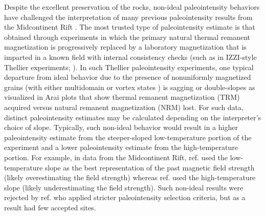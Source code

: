 \documentclass[9pt,twocolumn,twoside,lineno]{pnas-new}
\begin{document}
Despite the excellent preservation of the rocks, non-ideal paleointensity behaviors have challenged the interpretation of many previous paleointensity results from the Midcontinent Rift \cite{Pesonen1983a, Kulakov2013a, Sprain2018a}. The most trusted type of paleointensity estimate is that obtained through experiments in which the primary natural thermal remanent magnetization is progressively replaced by a laboratory magnetization that is imparted in a known field with internal consistency checks (such as in IZZI-style Thellier experiments;  \citealp{Yu2004a}). In such Thellier paleointensity experiments, one typical departure from ideal behavior due to the presence of nonuniformly magnetized grains (with either multidomain \cite{Dunlop2001a} or vortex states \cite{Tauxe2020a}) is sagging or double-slopes as visualized in Arai plots that show thermal remanent magnetization (TRM) acquired versus natural remanent magnetization (NRM) lost. For such data, distinct paleointensity estimates may be calculated depending on the interpreter's choice of slope. Typically, such non-ideal behavior would result in a higher paleointensity estimate from the steeper-sloped low-temperature portion of the experiment and a lower paleointensity estimate from the high-temperature portion. For example, in data from the Midcontinent Rift, ref. \citealp{Pesonen1983a} used the low-temperature slope as the best representation of the past magnetic field strength (likely overestimating the field strength) whereas ref. \citealp{Kulakov2013a} used the high-temperature slope (likely underestimating the field strength). Such non-ideal results were rejected by ref. \citealp{Sprain2018a} who applied stricter paleointensity selection criteria, but as a result had few accepted sites.
\end{document}

